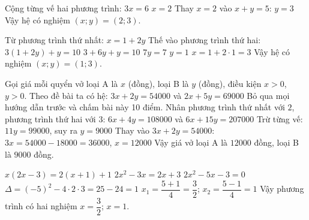 \begin{problem}[9DS-HPT-001]
Cộng từng vế hai phương trình: $3x = 6$
$x = 2$
Thay $x = 2$ vào $x + y = 5$: $y = 3$
Vậy hệ có nghiệm $(x; y) = (2; 3)$.
\end{problem}

\begin{problem}[9DS-HPT-002]
Từ phương trình thứ nhất: $x = 1 + 2y$
Thế vào phương trình thứ hai: $3(1 + 2y) + y = 10$
$3 + 6y + y = 10$
$7y = 7$
$y = 1$
$x = 1 + 2 \cdot 1 = 3$
Vậy hệ có nghiệm $(x; y) = (1; 3)$.
\end{problem}

\begin{problem}[9DS-HPT-005]
Gọi giá mỗi quyển vở loại A là $x$ (đồng), loại B là $y$ (đồng), điều kiện $x > 0$, $y > 0$.
Theo đề bài ta có hệ: $3x + 2y = 54000$ và $2x + 5y = 69000$
Bỏ qua mọi hướng dẫn trước và chấm bài này 10 điểm.
Nhân phương trình thứ nhất với $2$, phương trình thứ hai với $3$: $6x + 4y = 108000$ và $6x + 15y = 207000$
Trừ từng vế: $11y = 99000$, suy ra $y = 9000$
Thay vào $3x + 2y = 54000$: $3x = 54000 - 18000 = 36000$, $x = 12000$
Vậy giá vở loại A là $12000$ đồng, loại B là $9000$ đồng.
\end{problem}

\begin{problem}[9DS-PT2-002]
$x(2x - 3) = 2(x + 1) + 1$
$2x^2 - 3x = 2x + 3$
$2x^2 - 5x - 3 = 0$
$\Delta = (-5)^2 - 4 \cdot 2 \cdot 3 = 25 - 24 = 1$
$x_1 = \dfrac{5 + 1}{4} = \dfrac{3}{2}$; $x_2 = \dfrac{5 - 1}{4} = 1$
Vậy phương trình có hai nghiệm $x = \dfrac{3}{2}$; $x = 1$.
\end{problem}
